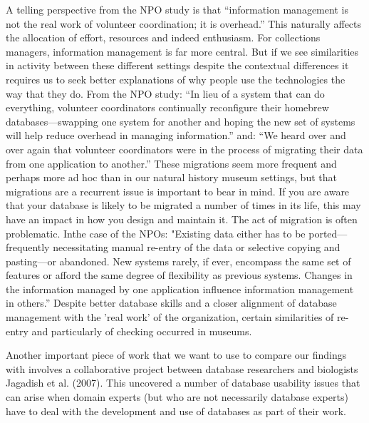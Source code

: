 A telling perspective from the NPO study is that “information management is not the real work of volunteer coordination; it is overhead.” This naturally affects the allocation of effort, resources and indeed enthusiasm. For collections managers, information management is far more central. But if we see similarities in activity between these different settings despite the contextual differences it requires us to seek better explanations of why people use the technologies the way that they do. From the NPO study: “In lieu of a system that can do everything, volunteer coordinators continually reconfigure their homebrew databases—swapping one system for another and hoping the new set of systems will help reduce overhead in managing information.”  and: “We heard over and over again that volunteer coordinators were in the process of migrating their data from one application to another.” These migrations seem more frequent and perhaps more ad hoc than in our natural history museum settings, but that migrations are a recurrent issue is important to bear in mind. If you are aware that your database is likely to be migrated a number of times in its life, this may have an impact in how you design and maintain it. The act of migration is often problematic. Inthe case of the NPOs: "Existing data either has to be ported—frequently necessitating manual re-entry of the data or selective copying and pasting—or abandoned. New systems rarely, if ever, encompass the same set of features or afford the same degree of flexibility as previous systems. Changes in the information managed by one application influence information management in others.” Despite better database skills and a closer alignment of database management with the 'real work' of the organization, certain similarities of re-entry and particularly of checking occurred in museums.

Another important piece of work that we want to use to compare our findings with involves a collaborative project between database researchers and biologists Jagadish et al. (2007). This uncovered a number of database usability issues that can arise when domain experts (but who are not necessarily  database experts) have to deal with the development and use of databases as part of their work.
